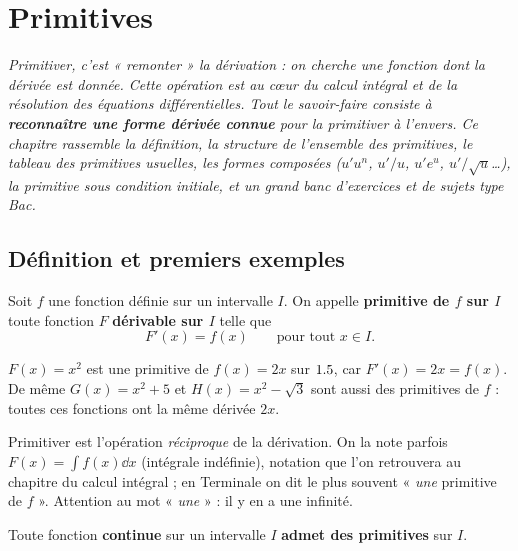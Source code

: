 \chapter{Primitives}

\noindent\textit{Primitiver, c'est « remonter » la dérivation : on cherche une fonction
dont la dérivée est donnée. Cette opération est au cœur du calcul intégral et de la
résolution des équations différentielles. Tout le savoir-faire consiste à
\textbf{reconnaître une forme dérivée connue} pour la primitiver à l'envers. Ce chapitre
rassemble la définition, la structure de l'ensemble des primitives, le tableau des
primitives usuelles, les formes composées ($u'u^{n}$, $u'/u$, $u'e^{u}$, $u'/\sqrt u$\dots),
la primitive sous condition initiale, et un grand banc d'exercices et de sujets type Bac.}
\vspace{8pt}

\section{Définition et premiers exemples}

\begin{definition}
Soit $f$ une fonction définie sur un intervalle $I$. On appelle \textbf{primitive de $f$ sur $I$}
toute fonction $F$ \textbf{dérivable sur $I$} telle que
\[
F'(x)=f(x)\qquad\text{pour tout }x\in I.
\]
\end{definition}

\begin{exemple}
$F(x)=x^{2}$ est une primitive de $f(x)=2x$ sur $1.5$, car $F'(x)=2x=f(x)$.
De même $G(x)=x^{2}+5$ et $H(x)=x^{2}-\sqrt3$ sont aussi des primitives de $f$ :
toutes ces fonctions ont la même dérivée $2x$.
\end{exemple}

\begin{remarque}
Primitiver est l'opération \emph{réciproque} de la dérivation. On la note parfois
$\displaystyle F(x)=\int f(x)\dd x$ (intégrale indéfinie), notation que l'on retrouvera
au chapitre du calcul intégral ; en Terminale on dit le plus souvent « \emph{une}
primitive de $f$ ». Attention au mot « \emph{une} » : il y en a une infinité.
\end{remarque}

\begin{theoreme}[Existence]
Toute fonction \textbf{continue} sur un intervalle $I$ \textbf{admet des primitives} sur $I$.
\end{theoreme}

